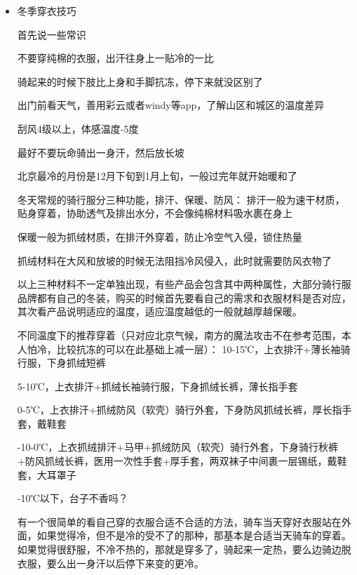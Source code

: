 \documentclass{ctexbook}
\begin{document}
    \begin{itemize}    
        \item    冬季穿衣技巧
    
    首先说一些常识

不要穿纯棉的衣服，出汗往身上一贴冷的一比

骑起来的时候下肢比上身和手脚抗冻，停下来就没区别了

出门前看天气，善用彩云或者windy等app，了解山区和城区的温度差异

刮风4级以上，体感温度-5度

最好不要玩命骑出一身汗，然后放长坡

北京最冷的月份是12月下旬到1月上旬，一般过完年就开始暖和了

冬天常规的骑行服分三种功能，排汗、保暖、防风：
排汗一般为速干材质，贴身穿着，协助透气及排出水分，不会像纯棉材料吸水裹在身上

保暖一般为抓绒材质，在排汗外穿着，防止冷空气入侵，锁住热量

抓绒材料在大风和放坡的时候无法阻挡冷风侵入，此时就需要防风衣物了

以上三种材料不一定单独出现，有些产品会包含其中两种属性，大部分骑行服品牌都有自己的冬装，购买的时候首先要看自己的需求和衣服材料是否对应，其次看产品说明适应的温度，适应温度越低的一般就越厚越保暖。

不同温度下的推荐穿着（只对应北京气候，南方的魔法攻击不在参考范围，本人怕冷，比较抗冻的可以在此基础上减一层）：
10-15℃，上衣排汗+薄长袖骑行服，下身抓绒短裤

5-10℃，上衣排汗+抓绒长袖骑行服，下身抓绒长裤，薄长指手套

0-5℃，上衣排汗+抓绒防风（软壳）骑行外套，下身防风抓绒长裤，厚长指手套，戴鞋套

-10-0℃，上衣抓绒排汗+马甲+抓绒防风（软壳）骑行外套，下身骑行秋裤+防风抓绒长裤，医用一次性手套+厚手套，两双袜子中间裹一层锡纸，戴鞋套，大耳罩子

-10℃以下，台子不香吗？


有一个很简单的看自己穿的衣服合适不合适的方法，骑车当天穿好衣服站在外面，如果觉得冷，但不是冷的受不了的那种，那基本是合适当天骑车的穿着。如果觉得很舒服，不冷不热的，那就是穿多了，骑起来一定热，要么边骑边脱衣服，要么出一身汗以后停下来变的更冷。
\end{itemize}
    
\end{document}

